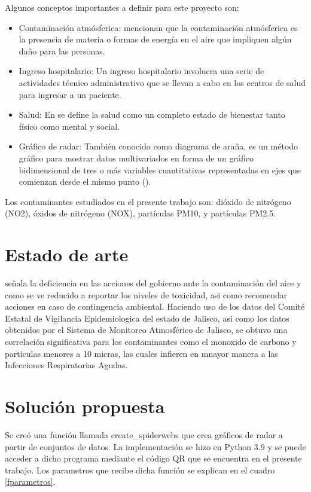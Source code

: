 \documentclass[a0]{sciposter} %
\begin{document}
\begin{multicols}{2}
Algunos conceptos importantes a definir para este proyecto son:  
\begin{itemize}
    \item Contaminación atmósferica: \citet{bib4} mencionan que la contaminación atmósferica es la presencia de materia o formas de energía en el aire que impliquen algún daño para las personas.
    \item Ingreso hospitalario: Un ingreso hospitalario involucra una serie de actividades técnico administrativo que se llevan a cabo en los centros de salud para ingresar a un paciente.
    \item Salud: En \citet{bib3} se define la salud como un completo estado de bienestar tanto físico como mental y social.
    \item Gráfico de radar: También conocido como diagrama de araña, es un método gráfico para mostrar datos multivariados en forma de un gráfico bidimensional de tres o más variables cuantitativas representadas en ejes que comienzan desde el mismo punto (\citet{bib5}).  
\end{itemize}
 Los contaminantes estudiados en el presente trabajo son: dióxido de nitrógeno (NO2), óxidos de nitrógeno (NOX), partículas PM10, y partículas PM2.5.


\section{Estado de arte}

\citet{bib1} señala la deficiencia en las acciones del gobierno ante la contaminación del aire y como se ve reducido a reportar los niveles de toxicidad, asi como recomendar acciones en caso de contingencia ambiental. Haciendo uso de los datos del Comité Estatal de Vigilancia Epidemiologica del estado de Jalisco, asi como los datos obtenidos por el Sistema de Monitoreo Atmosférico de Jalisco, se obtuvo una correlación significativa para los contaminantes como el monoxido de carbono y particulas menores a 10 micras, las cuales infieren en mnayor manera a las Infecciones Respiratorias Agudas. 

\section{Solución propuesta}

Se creó una función llamada create\_spiderwebs que crea gráficos de radar a partir de conjuntos de datos. 
La implementación se hizo en Python 3.9 \citep{python} y se puede acceder a dicho programa mediante el código QR que se encuentra en el presente trabajo. Los parametros que recibe dicha función se explican en el cuadro \ref{fparametros}. 


\end{multicols}
\end{document}
